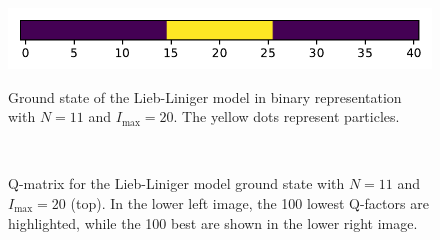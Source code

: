 \documentclass[11pt, a4paper]{report} %
\begin{document}
\begin{figure}[tb!]
  \centering
  \includegraphics{state.pdf}
  \caption{Ground state of the Lieb-Liniger model in binary representation with \(N=11\) and \(I_{\max}=20\). The yellow dots represent particles.}
  \label{fig:binarygroundstate}
  \vspace*{\floatsep}
  \\
  \caption{Q-matrix for the Lieb-Liniger model ground state with \(N=11\) and \(I_{\max}=20\) (top). In the lower left image, the 100 lowest Q-factors are highlighted, while the 100 best are shown in the lower right image.}
  \label{fig:qmatrix}
\end{figure}
\end{document}
